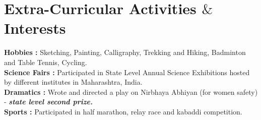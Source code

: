 \section{Extra-Curricular Activities $\&$ Interests}
    \textbf{Hobbies :} Sketching, Painting, Calligraphy, Trekking and Hiking, Badminton and Table Tennis, Cycling.\\
    \textbf{Science Fairs :} Participated in State Level Annual Science Exhibitions hosted by different institutes in Maharashtra, India. \\
    \textbf{Dramatics :} Wrote and directed a play on Nirbhaya Abhiyan (for women safety) - \textbf{\textit{state level second prize.}}\\
    \textbf{Sports :} Participated in half marathon, relay race and kabaddi competition. \\


